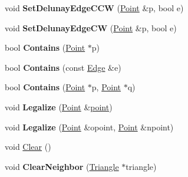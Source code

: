 \begin{DoxyCompactItemize}
\item 
\hypertarget{classp2t_1_1_triangle_a3d67473bf2f2372f5578cce2ebcdea98}{void {\bfseries Set\+Delunay\+Edge\+C\+C\+W} (\hyperlink{structp2t_1_1_point}{Point} \&p, bool e)}\label{classp2t_1_1_triangle_a3d67473bf2f2372f5578cce2ebcdea98}

\item 
\hypertarget{classp2t_1_1_triangle_a8e2249fdb5e69ba34f755d35e5a1d6c0}{void {\bfseries Set\+Delunay\+Edge\+C\+W} (\hyperlink{structp2t_1_1_point}{Point} \&p, bool e)}\label{classp2t_1_1_triangle_a8e2249fdb5e69ba34f755d35e5a1d6c0}

\item 
\hypertarget{classp2t_1_1_triangle_a8fa39b02695b1eca43efc3f516042d39}{bool {\bfseries Contains} (\hyperlink{structp2t_1_1_point}{Point} $\ast$p)}\label{classp2t_1_1_triangle_a8fa39b02695b1eca43efc3f516042d39}

\item 
\hypertarget{classp2t_1_1_triangle_a0f114b21e57a40eb10ac7064772b41a0}{bool {\bfseries Contains} (const \hyperlink{structp2t_1_1_edge}{Edge} \&e)}\label{classp2t_1_1_triangle_a0f114b21e57a40eb10ac7064772b41a0}

\item 
\hypertarget{classp2t_1_1_triangle_ab2d4e892757db9b068e227b763fab220}{bool {\bfseries Contains} (\hyperlink{structp2t_1_1_point}{Point} $\ast$p, \hyperlink{structp2t_1_1_point}{Point} $\ast$q)}\label{classp2t_1_1_triangle_ab2d4e892757db9b068e227b763fab220}

\item 
\hypertarget{classp2t_1_1_triangle_ab9aba40377c6eb249451da43c40341de}{void {\bfseries Legalize} (\hyperlink{structp2t_1_1_point}{Point} \&\hyperlink{structpoint}{point})}\label{classp2t_1_1_triangle_ab9aba40377c6eb249451da43c40341de}

\item 
\hypertarget{classp2t_1_1_triangle_a297b1c66e693b6bbc9d64f93dc4b8866}{void {\bfseries Legalize} (\hyperlink{structp2t_1_1_point}{Point} \&opoint, \hyperlink{structp2t_1_1_point}{Point} \&npoint)}\label{classp2t_1_1_triangle_a297b1c66e693b6bbc9d64f93dc4b8866}

\item 
void \hyperlink{classp2t_1_1_triangle_a621468777e1685455c9fe1763e90b0bd}{Clear} ()
\item 
\hypertarget{classp2t_1_1_triangle_a39ce39aed8d93cfaad33983e63b87c90}{void {\bfseries Clear\+Neighbor} (\hyperlink{classp2t_1_1_triangle}{Triangle} $\ast$triangle)}\label{classp2t_1_1_triangle_a39ce39aed8d93cfaad33983e63b87c90}


\end{DoxyCompactItemize}
